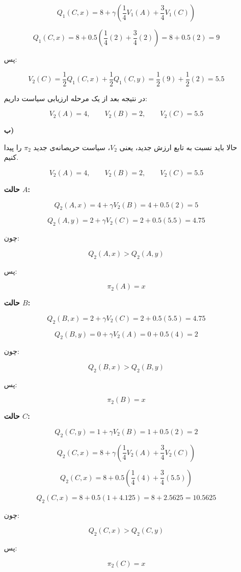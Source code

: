 \begin{enumerate}
\[
Q_1(C,x)
=
8+\gamma\left(\frac{1}{4}V_1(A)+\frac{3}{4}V_1(C)\right)
\]

\[
Q_1(C,x)
=
8+0.5\left(\frac{1}{4}(2)+\frac{3}{4}(2)\right)
=
8+0.5(2)=9
\]

پس:

\[
V_2(C)=\frac{1}{2}Q_1(C,x)+\frac{1}{2}Q_1(C,y)
=
\frac{1}{2}(9)+\frac{1}{2}(2)=5.5
\]

در نتیجه بعد از یک مرحله ارزیابی سیاست داریم:

\[
\boxed{
V_2(A)=4,\qquad V_2(B)=2,\qquad V_2(C)=5.5
}
\]

\item[\textbf{ب)}]

حالا باید نسبت به تابع ارزش جدید، یعنی \(V_2\)، سیاست حریصانه‌ی جدید \(\pi_2\) را پیدا کنیم.

\[
V_2(A)=4,\qquad V_2(B)=2,\qquad V_2(C)=5.5
\]

\medskip

\textbf{حالت \(A\):}

\[
Q_2(A,x)=4+\gamma V_2(B)=4+0.5(2)=5
\]

\[
Q_2(A,y)=2+\gamma V_2(C)=2+0.5(5.5)=4.75
\]

چون:

\[
Q_2(A,x)>Q_2(A,y)
\]

پس:

\[
\pi_2(A)=x
\]

\medskip

\textbf{حالت \(B\):}

\[
Q_2(B,x)=2+\gamma V_2(C)=2+0.5(5.5)=4.75
\]

\[
Q_2(B,y)=0+\gamma V_2(A)=0+0.5(4)=2
\]

چون:

\[
Q_2(B,x)>Q_2(B,y)
\]

پس:

\[
\pi_2(B)=x
\]

\medskip

\textbf{حالت \(C\):}

\[
Q_2(C,y)=1+\gamma V_2(B)=1+0.5(2)=2
\]

\[
Q_2(C,x)
=
8+\gamma\left(\frac{1}{4}V_2(A)+\frac{3}{4}V_2(C)\right)
\]

\[
Q_2(C,x)
=
8+0.5\left(\frac{1}{4}(4)+\frac{3}{4}(5.5)\right)
\]

\[
Q_2(C,x)
=
8+0.5(1+4.125)
=
8+2.5625
=
10.5625
\]

چون:

\[
Q_2(C,x)>Q_2(C,y)
\]

پس:

\[
\pi_2(C)=x
\]


\end{enumerate}

